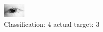 \begin{figure}[h!]
\begin{center}
\includegraphics[width=0.60\columnwidth]{figures/ID35_class_4_target_3.png}
\end{center}
\caption{ Classification: 4 actual target: 3}
\label{fig:ID35_class_4_target_3}
\end{figure}

